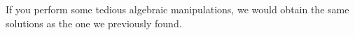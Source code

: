 \documentclass[11pt]{article}
\begin{document}
\begin{appendices}
		If you perform some tedious algebraic manipulations, we would obtain the same solutions as the one we previously found.
		\vfill
	\end{appendices}
\end{document}
